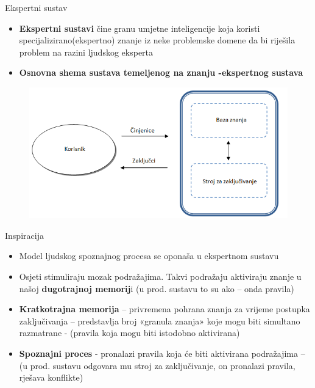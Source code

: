 \documentclass[xcolor=dvipsnames]{beamer}
\begin{document}
\begin{frame}{Ekspertni sustav}

\begin{itemize}
	\item \textbf{Ekspertni sustavi} čine granu umjetne inteligencije koja koristi 
	specijalizirano(ekspertno) znanje iz neke problemske domene da bi 
	riješila problem na razini ljudskog eksperta
	\item \textbf{Osnovna shema sustava temeljenog na znanju -ekspertnog sustava}
\end{itemize}

\begin{figure}
\center

\includegraphics[scale=0.5]{img/shema.png}

\end{figure}
\end{frame}




\begin{frame}{Inspiracija}

\begin{itemize}
	\item Model ljudskog spoznajnog procesa se oponaša u ekspertnom sustavu
	\item Osjeti stimuliraju mozak podražajima. Takvi podražaju aktiviraju znanje u našoj \textbf{dugotrajnoj memorij}i (u prod. sustavu to su ako – onda pravila)
	\item  \textbf{Kratkotrajna memorija} – privremena pohrana znanja za vrijeme postupka zaključivanja – predstavlja broj «granula znanja» koje mogu biti simultano razmatrane - (pravila koja mogu biti istodobno aktivirana) 
	\item \textbf{Spoznajni proces} - pronalazi pravila koja će biti aktivirana podražajima – (u prod. sustavu odgovara mu stroj za zaključivanje, on pronalazi pravila, rješava konflikte) 
\end{itemize}
\end{frame}
\end{document}
